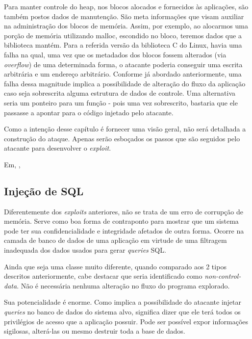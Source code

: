 			Para manter controle do heap, nos blocos alocados e fornecidos às aplicações,
			são também postos dados de manutenção. São meta informações que visam auxiliar
			na administração dos blocos de memória. Assim, por exemplo, ao alocarmos uma porção
			de memória utilizando malloc, escondido no bloco, teremos dados que a biblioteca
			mantém.	Para a referida versão da biblioteca C do Linux, havia uma falha na qual, 
			uma vez que os metadados dos blocos fossem alterados (via \textsl{overflow}) de uma
			determinada forma, o atacante poderia conseguir uma escrita arbitrária e um endereço arbitrário.
			Conforme já abordado anteriormente, uma falha dessa magnitude implica a possibilidade
			de alteração do fluxo da aplicação caso seja sobrescrita alguma estrutura de dados de controle.
			Uma alternativa seria um ponteiro para um função - pois uma vez sobrescrito, bastaria
			que ele passasse a apontar para o código injetado pelo atacante.


			Como a intenção desse capítulo é fornecer uma visão geral, não será detalhada
			a construção do ataque. Apenas serão esboçados os passos que são seguidos pelo atacante
			para desenvolver o \textsl{exploit}.
			
			Em, \cite{Anley2007}, 
				
		
		\subsection{Injeção de SQL}
			Diferentemente dos \textsl{exploits} anteriores, não se trata de um erro de corrupção
			de memória. Serve como boa forma de contraponto para mostrar que um sistema
			pode ter sua confidencialidade e integridade afetados de outra forma.
			Ocorre na camada de banco de dados de uma aplicação em virtude de uma filtragem inadequada
			dos dados usados para gerar \textsl{queries} SQL.			

			
			Ainda que seja uma classe muito diferente, quando comparado aos 2 tipos 
			descritos anteriormente, cabe destacar que seria identificado como 
			\textsl{non-control-data}. Não é necessária nenhuma alteração no fluxo do programa
			explorado.

			
			Sua potencialidade é enorme. Como implica a possibilidade do atacante
			injetar \textsl{queries} no banco de dados do sistema alvo, significa
			dizer que ele terá todos os privilégios de acesso que a aplicação possuir.
			Pode ser possível expor informações sigilosas, alterá-las ou mesmo destruir
			toda a base de dados.


